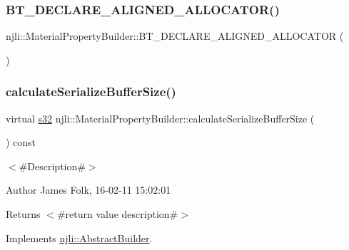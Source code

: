 \subsubsection{\texorpdfstring{B\+T\+\_\+\+D\+E\+C\+L\+A\+R\+E\+\_\+\+A\+L\+I\+G\+N\+E\+D\+\_\+\+A\+L\+L\+O\+C\+A\+T\+O\+R()}{BT\_DECLARE\_ALIGNED\_ALLOCATOR()}}
{\footnotesize\ttfamily njli\+::\+Material\+Property\+Builder\+::\+B\+T\+\_\+\+D\+E\+C\+L\+A\+R\+E\+\_\+\+A\+L\+I\+G\+N\+E\+D\+\_\+\+A\+L\+L\+O\+C\+A\+T\+OR (\begin{DoxyParamCaption}{ }\end{DoxyParamCaption})\hspace{0.3cm}{\ttfamily [protected]}}

\mbox{\label{classnjli_1_1_material_property_builder_a9a614b1c939742e7cf607609bc203c5e}} 
\subsubsection{\texorpdfstring{calculate\+Serialize\+Buffer\+Size()}{calculateSerializeBufferSize()}}
{\footnotesize\ttfamily virtual \mbox{\hyperlink{_util_8h_aa62c75d314a0d1f37f79c4b73b2292e2}{s32}} njli\+::\+Material\+Property\+Builder\+::calculate\+Serialize\+Buffer\+Size (\begin{DoxyParamCaption}{ }\end{DoxyParamCaption}) const\hspace{0.3cm}{\ttfamily [virtual]}}



$<$\#\+Description\#$>$ 

\begin{DoxyAuthor}{Author}
James Folk, 16-\/02-\/11 15\+:02\+:01
\end{DoxyAuthor}
\begin{DoxyReturn}{Returns}
$<$\#return value description\#$>$ 
\end{DoxyReturn}


Implements \mbox{\hyperlink{classnjli_1_1_abstract_builder_aa1d220053e182c37b31b427499c6eacf}{njli\+::\+Abstract\+Builder}}.

\mbox{\label{classnjli_1_1_material_property_builder_a3efbcba21da4d8a4908809685974b127}} 
